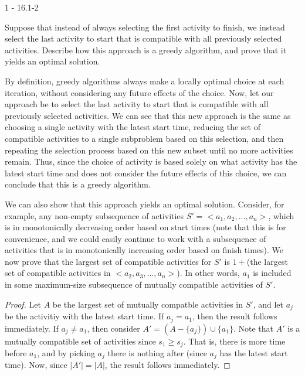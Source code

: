 \documentclass[11pt]{article}
\begin{document}

\begin{prob}{1 - 16.1-2}

Suppose that instead of always selecting the first activity to finish, we instead select the last activity to start that is compatible with all previously selected activities. Describe how this approach is a greedy algorithm, and prove that it yields an optimal solution.
\end{prob}
\begin{sol}

By definition, greedy algorithms always make a locally optimal choice at each iteration, without considering any future effects of the choice. Now, let our approach be to select the last activity to start that is compatible with all previously selected activities. We can see that this new approach is the same as choosing a single activity with the latest start time, reducing the set of compatible activities to a single subproblem based on this selection, and then repeating the selection process based on this new subset until no more activities remain. Thus, since the choice of activity is based solely on what activity has the latest start time and does not consider the future effects of this choice, we can conclude that this is a greedy algorithm. 

We can also show that this approach yields an optimal solution. Consider, for example, any non-empty subsequence of activities $S' = <a_1, a_2, ..., a_n>$, which is in monotonically decreasing order based on start times (note that this is for convenience, and we could easily continue to work with a subsequence of activities that is in monotonically increasing order based on finish times). We now prove that the largest set of compatible activities for $S'$ is $1 + $(the largest set of compatible activities in $<a_2, a_3,..., a_n>$). In other words, $a_1$ is included in some maximum-size subsequence of mutually compatible activities of $S'$.

\begin{proof}
Let $A$ be the largest set of mutually compatble activities in $S'$, and let $a_j$ be the activitiy with the latest start time. If $a_j = a_1$, then the result follows immediately. If $a_j \not= a_1$, then consider $A' = (A - \{a_j\}) \cup \{a_1\}$. Note that $A'$ is a mutually compatible set of activities since $s_1 \geq s_j$. That is, there is more time before $a_1$, and by picking $a_j$ there is nothing after (since $a_j$ has the latest start time). Now, since $|A'| = |A|$, the result follows immediately.
\end{proof}


\end{sol}
\end{document}
